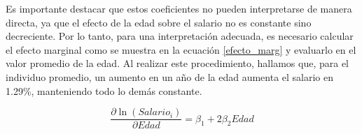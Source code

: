 \documentclass[article,11 pt]{article}
\begin{document}
\begin{table}[!htbp] 
\centering 
\caption{Resultados Modelo 1} 
\label{modelo1tab} 
\end{table}
Es importante destacar que estos coeficientes no pueden interpretarse de manera directa, ya que el efecto de la edad sobre el salario no es constante sino decreciente. Por lo tanto, para una interpretación adecuada, es necesario calcular el efecto marginal como se muestra en la ecuación \ref{efecto_marg} y evaluarlo en el valor promedio de la edad. Al realizar este procedimiento, hallamos que, para el individuo promedio, un aumento en un año de la edad aumenta el salario en 1.29\%, manteniendo todo lo demás constante.

\begin{equation}
    \frac{\partial \ln(Salario_i)}{\partial Edad} = \beta_1 + 2\beta_2 Edad
    \label{efecto_marg}
\end{equation}
\end{document}
